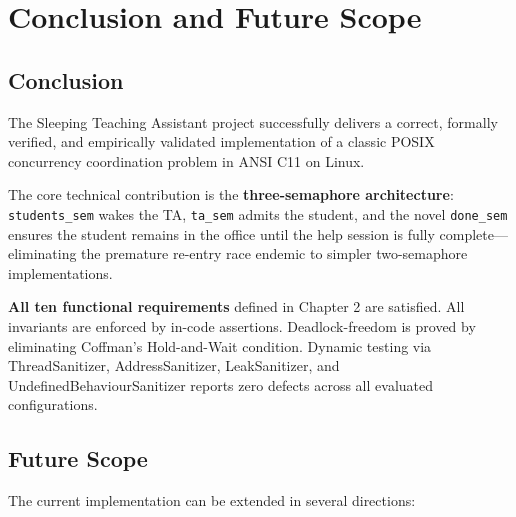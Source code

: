 \documentclass[12pt,a4paper]{report}
\begin{document}
\chapter{Conclusion and Future Scope}

\section{Conclusion}

The Sleeping Teaching Assistant project successfully delivers a correct, formally verified, and
empirically validated implementation of a classic POSIX concurrency coordination problem in
ANSI C11 on Linux.

The core technical contribution is the \textbf{three-semaphore architecture}: \texttt{students\_sem}
wakes the TA, \texttt{ta\_sem} admits the student, and the novel \texttt{done\_sem} ensures the
student remains in the office until the help session is fully complete---eliminating the
premature re-entry race endemic to simpler two-semaphore implementations.

\textbf{All ten functional requirements} defined in Chapter 2 are satisfied. All invariants
are enforced by in-code assertions. Deadlock-freedom is proved by eliminating Coffman's
Hold-and-Wait condition. Dynamic testing via ThreadSanitizer, AddressSanitizer,
LeakSanitizer, and UndefinedBehaviourSanitizer reports zero defects across all evaluated
configurations.

\section{Future Scope}

The current implementation can be extended in several directions:
\end{document}
